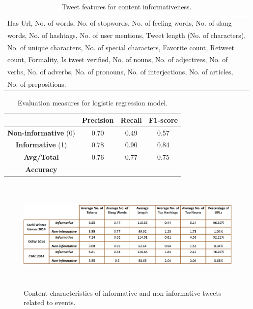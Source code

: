 \begin{savenotes}
\begin{table}[ht]
\centering
\caption{Tweet features for content informativeness.}
\label{tweetfeature}
\begin{tabular}{|l|}
\hline
Has Url, No. of words, No. of stopwords, No. of feeling words, No. of slang \\ 
words, No. of hashtags, No. of user mentions, Tweet  length (No. of characters),\\  No. of unique 
characters, No. of special characters, Favorite count, Retweet \\ count, Formality, Is tweet verified, No. of nouns, No. of adjectives, No. of \\ verbs, No. of adverbs, No. of pronouns, No. of interjections, No. of articles, \\ No. of prepositions.
 \\ \hline
\end{tabular}
\end{table}
\end{savenotes}

\begin{table}[ht]
\centering
\caption{Evaluation measures for logistic regression model.}
\label{logregreseval}
\begin{tabular}{c|c|c|c|}
\cline{2-4}
\multicolumn{1}{l|}{}                          & \textbf{Precision} & \textbf{Recall}       & \textbf{F1-score}     \\ \hline
\multicolumn{1}{|c|}{\textbf{Non-informative} (0)} & 0.70               & 0.49                  & 0.57                  \\ \hline
\multicolumn{1}{|c|}{\textbf{Informative} (1)}     & 0.78               & 0.90                  & 0.84                  \\ \hline
\multicolumn{1}{|c|}{\textbf{Avg/Total}}       & 0.76               & 0.77                  & 0.75                  \\ \hline
\multicolumn{1}{|c}{\textbf{Accuracy}} =  & \multicolumn{1}{l}{} 76.64\%            & \multicolumn{1}{l}{} & \multicolumn{1}{l|}{} \\ \hline
\end{tabular}
\end{table}

\begin{figure}[htbp]
\centering
\caption{Content characteristics of informative and non-informative tweets related to events.}
    \includegraphics[width=15cm,height=5.5cm]{Figures/InformationAnalysisTable.jpg}
    
    \label{infoanalysis}
\end{figure}

